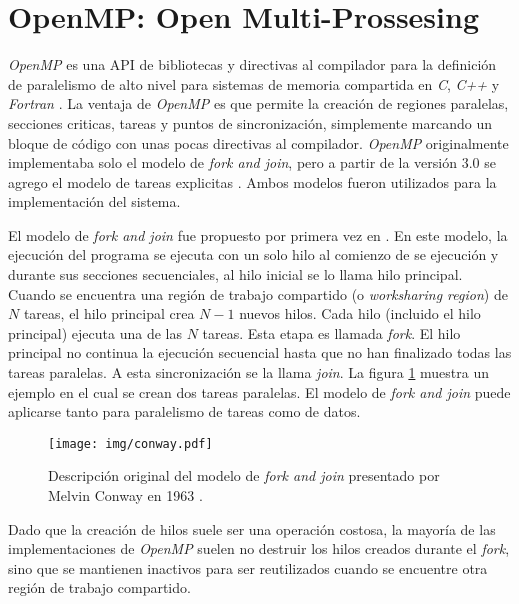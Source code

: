 
\section{OpenMP: Open Multi-Prossesing}

\emph{OpenMP} es una API de bibliotecas y directivas al compilador para la
definición de paralelismo de alto nivel para sistemas de memoria compartida en
\emph{C}, \emph{C++} y \emph{Fortran} \cite{ompWeb}. La ventaja de \emph{OpenMP}
es que permite la creación de regiones paralelas, secciones criticas, tareas y
puntos de sincronización, simplemente marcando un bloque de código con unas
pocas directivas al compilador. \emph{OpenMP} originalmente implementaba solo el
modelo de \emph{fork and join}, pero a partir de la versión $3.0$ se agrego el
modelo de tareas explicitas \cite{openmp08}. Ambos modelos fueron utilizados para
la implementación del sistema.

El modelo de \emph{fork and join} fue propuesto por primera vez en
\cite{conway1963}. En este modelo, la ejecución del programa se ejecuta con un
solo hilo al comienzo de se ejecución y durante sus secciones secuenciales, al
hilo inicial se lo llama hilo principal. Cuando se encuentra una región de
trabajo compartido (o \emph{worksharing region}) de $N$ tareas, el hilo
principal crea $N-1$ nuevos hilos. Cada hilo (incluido el hilo principal)
ejecuta una de las $N$ tareas. Esta etapa es llamada \emph{fork}. El hilo
principal no continua la ejecución secuencial hasta que no han finalizado todas
las tareas paralelas. A esta sincronización se la llama \emph{join}. La figura
\ref{conway} muestra un ejemplo en el cual se crean dos tareas paralelas. El
modelo de \emph{fork and join} puede aplicarse tanto para paralelismo de tareas
como de datos. 

\begin{figure}[!h]

	\centering

	\texttt{[image: img/conway.pdf]}

	\caption{Descripción original del modelo de \emph{fork and join}
	presentado por Melvin Conway en 1963 \cite{conway1963}.}

	\label{conway}

\end{figure}

Dado que la creación de hilos suele ser una operación costosa, la mayoría de las
implementaciones de \emph{OpenMP} suelen no destruir los hilos creados durante
el \emph{fork}, sino que se mantienen inactivos para ser reutilizados cuando se
encuentre otra región de trabajo compartido.

